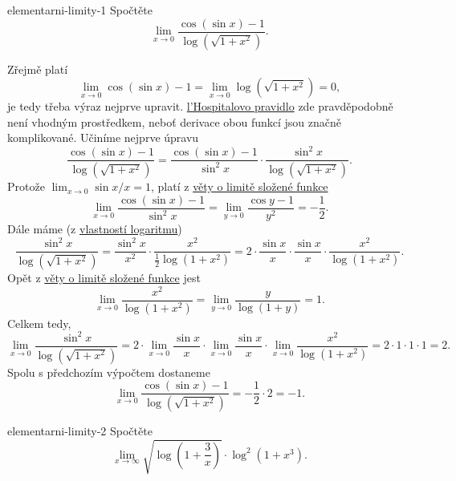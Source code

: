 \begin{problem}{}{elementarni-limity-1}
 Spočtěte
 \[
  \lim_{x \to 0} \frac{\cos(\sin x) - 1}{\log(\sqrt{1 + x^2})}.
 \]
\end{problem}
\begin{probsol}
 Zřejmě platí
 \[
  \lim_{x \to 0} \cos(\sin x) - 1 = \lim_{x \to 0} \log(\sqrt{1 + x^2}) = 0,
 \]
 je tedy třeba výraz nejprve upravit. \hyperref[thm:lhospital]{l'Hospitalovo
 pravidlo} zde pravděpodobně není vhodným prostředkem, neboť derivace obou
 funkcí jsou značně komplikované. Učiníme nejprve úpravu
 \[
  \frac{\cos(\sin x) - 1}{\log(\sqrt{1 + x^2})} = \frac{\cos(\sin x) -
  1}{\sin^2 x} \cdot \frac{\sin^2 x}{\log(\sqrt{1 + x^2})}.
 \]
 Protože $\lim_{x \to 0} \sin x / x = 1$, platí z
 \hyperref[thm:limita-slozene-funkce]{věty o limitě složené funkce}
 \[
  \lim_{x \to 0} \frac{\cos(\sin x) - 1}{\sin^2 x} = \lim_{y \to 0} \frac{\cos y
  - 1}{y^2} = -\frac{1}{2}.
 \]
 Dále máme (z \hyperref[prop:vlastnosti-logaritmu]{vlastností logaritmu})
 \[
  \frac{\sin^2 x}{\log(\sqrt{1 + x^2})} = \frac{\sin^2 x}{x^2} \cdot
  \frac{x^2}{\frac{1}{2}\log(1 + x^2)} = 2 \cdot \frac{\sin x}{x} \cdot
  \frac{\sin x}{x} \cdot \frac{x^2}{\log(1 + x^2)}.
 \]
 Opět z \hyperref[thm:limita-slozene-funkce]{věty o limitě složené funkce} jest
 \[
  \lim_{x \to 0} \frac{x^2}{\log(1 + x^2)} = \lim_{y \to 0} \frac{y}{\log(1 +
  y)} = 1.
 \]
 Celkem tedy,
 \[
  \lim_{x \to 0} \frac{\sin^2 x}{\log(\sqrt{1 + x^2})} = 2 \cdot \lim_{x \to 0}
  \frac{\sin x}{x} \cdot \lim_{x \to 0} \frac{\sin x}{x} \cdot \lim_{x \to 0}
  \frac{x^2}{\log(1 + x^2)} = 2 \cdot 1 \cdot 1 \cdot 1 = 2.
 \]
 Spolu s předchozím výpočtem dostaneme
 \[
  \lim_{x \to 0} \frac{\cos(\sin x) - 1}{\log(\sqrt{1 + x^2})} = -\frac{1}{2}
  \cdot 2 = -1.
 \]
\end{probsol}

\begin{problem}{}{elementarni-limity-2}
 Spočtěte
 \[
  \lim_{x \to \infty} \sqrt{\log \left( 1 + \frac{3}{x} \right)} \cdot
  \log^2(1+x^3).
 \]
\end{problem}
